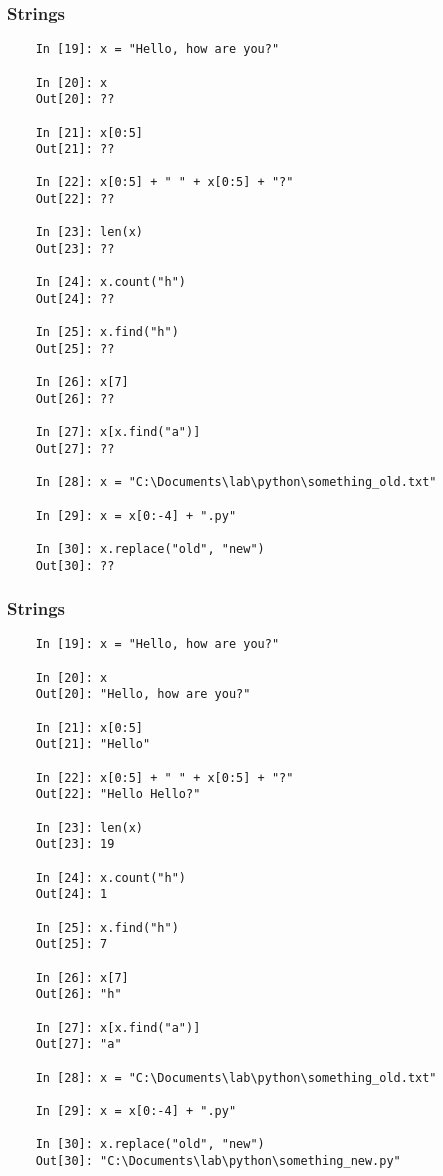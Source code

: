 \documentclass{beamer}
\begin{document}
\begin{frame}[fragile]
\frametitle{Strings}

\begin{lstlisting}
	In [19]: x = "Hello, how are you?"

	In [20]: x
	Out[20]: ??

	In [21]: x[0:5]
	Out[21]: ??

	In [22]: x[0:5] + " " + x[0:5] + "?"
	Out[22]: ??

	In [23]: len(x)
	Out[23]: ??

	In [24]: x.count("h")
	Out[24]: ??

	In [25]: x.find("h")
	Out[25]: ??

	In [26]: x[7]
	Out[26]: ?? 

	In [27]: x[x.find("a")]
	Out[27]: ?? 

	In [28]: x = "C:\Documents\lab\python\something_old.txt"

	In [29]: x = x[0:-4] + ".py"
	
	In [30]: x.replace("old", "new")
	Out[30]: ?? 

\end{lstlisting}
\end{frame}

\begin{frame}[fragile]
\frametitle{Strings}

\begin{lstlisting}
	In [19]: x = "Hello, how are you?"

	In [20]: x
	Out[20]: "Hello, how are you?" 

	In [21]: x[0:5]
	Out[21]: "Hello" 

	In [22]: x[0:5] + " " + x[0:5] + "?"
	Out[22]: "Hello Hello?" 

	In [23]: len(x)
	Out[23]: 19  

	In [24]: x.count("h")
	Out[24]: 1 

	In [25]: x.find("h")
	Out[25]: 7

	In [26]: x[7]
	Out[26]: "h"

	In [27]: x[x.find("a")]
	Out[27]: "a"

	In [28]: x = "C:\Documents\lab\python\something_old.txt"

	In [29]: x = x[0:-4] + ".py"
	
	In [30]: x.replace("old", "new")
	Out[30]: "C:\Documents\lab\python\something_new.py" 
\end{lstlisting}
\end{frame}
\end{document}
